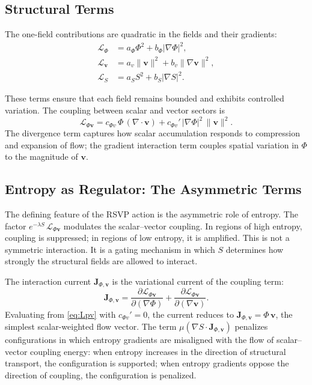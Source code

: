 \documentclass[11pt]{article}
\theoremstyle{definition}
\begin{document}
\subsection{Structural Terms}

The one-field contributions are quadratic in the fields and their gradients:
\begin{align}
  \mathcal{L}_\Phi &= a_\Phi \Phi^2 + b_\Phi |\nabla\Phi|^2, \\
  \mathcal{L}_{\mathbf{v}} &= a_v \|\mathbf{v}\|^2 + b_v \|\nabla\mathbf{v}\|^2, \\
  \mathcal{L}_S &= a_S S^2 + b_S |\nabla S|^2.
\end{align}

These terms ensure that each field remains bounded and exhibits controlled
variation. The coupling between scalar and vector sectors is
\begin{equation}
  \mathcal{L}_{\Phi\mathbf{v}}
  = c_{\Phi v}\,\Phi\,(\nabla \cdot \mathbf{v})
    + c_{\Phi v}'\,|\nabla\Phi|^2\,\|\mathbf{v}\|^2.
  \label{eq:Lpv}
\end{equation}
The divergence term captures how scalar accumulation responds to compression and
expansion of flow; the gradient interaction term couples spatial variation in
$\Phi$ to the magnitude of $\mathbf{v}$.

\subsection{Entropy as Regulator: The Asymmetric Terms}

The defining feature of the RSVP action is the asymmetric role of entropy. The
factor $e^{-\lambda S}\,\mathcal{L}_{\Phi\mathbf{v}}$ modulates the
scalar--vector coupling. In regions of high entropy, coupling is suppressed; in
regions of low entropy, it is amplified. This is not a symmetric interaction.
It is a gating mechanism in which $S$ determines how strongly the structural
fields are allowed to interact.

The interaction current $\mathbf{J}_{\Phi,\mathbf{v}}$ is the variational
current of the coupling term:
\begin{equation}
  \mathbf{J}_{\Phi,\mathbf{v}}
  = \frac{\partial \mathcal{L}_{\Phi\mathbf{v}}}{\partial(\nabla\Phi)}
  + \frac{\partial \mathcal{L}_{\Phi\mathbf{v}}}{\partial(\nabla\mathbf{v})}.
  \label{eq:current}
\end{equation}
Evaluating from \eqref{eq:Lpv} with $c_{\Phi v}' = 0$, the current reduces to
$\mathbf{J}_{\Phi,\mathbf{v}} = \Phi\,\mathbf{v}$, the simplest
scalar-weighted flow vector. The term $\mu(\nabla S \cdot
\mathbf{J}_{\Phi,\mathbf{v}})$ penalizes configurations in which entropy
gradients are misaligned with the flow of scalar--vector coupling energy:
when entropy increases in the direction of structural transport, the
configuration is supported; when entropy gradients oppose the direction of
coupling, the configuration is penalized.
\end{document}
